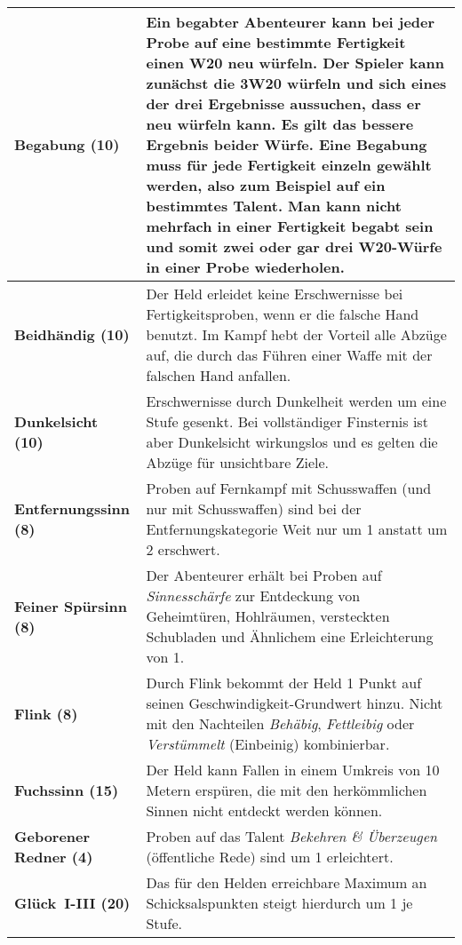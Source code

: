 \begin{longtable}{|p{5cm}|p{11cm}|}
\textbf{Begabung (10)} & Ein begabter Abenteurer kann bei jeder Probe auf eine bestimmte Fertigkeit einen W20 neu würfeln. Der Spieler kann zunächst die 3W20 würfeln und sich eines der drei Ergebnisse aussuchen, dass er neu würfeln kann. Es gilt das bessere Ergebnis beider Würfe. Eine Begabung muss für jede Fertigkeit einzeln gewählt werden, also zum Beispiel auf ein bestimmtes Talent. Man kann nicht mehrfach in einer Fertigkeit begabt sein und somit zwei oder gar drei W20-Würfe in einer Probe wiederholen. \\ \hline

\textbf{Beidhändig (10)} & Der Held erleidet keine Erschwernisse bei Fertigkeitsproben, wenn er die falsche Hand benutzt. Im Kampf hebt der Vorteil alle Abzüge auf, die durch das Führen einer Waffe mit der falschen Hand anfallen. \\ \hline

\textbf{Dunkelsicht (10)} & Erschwernisse durch Dunkelheit werden um eine Stufe gesenkt. Bei vollständiger Finsternis ist aber Dunkelsicht wirkungslos und es gelten die Abzüge für unsichtbare Ziele. \\ \hline

\textbf{Entfernungssinn (8)} & Proben auf Fernkampf mit Schusswaffen (und nur mit Schusswaffen) sind bei der Entfernungskategorie Weit nur um 1 anstatt um 2 erschwert. \\ \hline

\textbf{Feiner Spürsinn (8)} & Der Abenteurer erhält bei Proben auf \textit{Sinnesschärfe} zur Entdeckung von Geheimtüren, Hohlräumen, versteckten Schubladen und Ähnlichem eine Erleichterung von 1. \\ \hline

\textbf{Flink (8)} & Durch Flink bekommt der Held 1 Punkt auf seinen Geschwindigkeit-Grundwert hinzu. Nicht mit den Nachteilen \textit{Behäbig}, \textit{Fettleibig} oder \textit{Verstümmelt} (Einbeinig) kombinierbar. \\ \hline

\textbf{Fuchssinn (15)} & Der Held kann Fallen in einem Umkreis von 10 Metern erspüren, die mit den herkömmlichen Sinnen nicht entdeckt werden können. \\ \hline

\textbf{Geborener Redner (4)} & Proben auf das Talent \textit{Bekehren \& Überzeugen} (öffentliche Rede) sind um 1 erleichtert. \\ \hline

\textbf{Glück~I-III (20)} & Das für den Helden erreichbare Maximum an Schicksalspunkten steigt hierdurch um 1 je Stufe. \\ \hline


\end{longtable}
